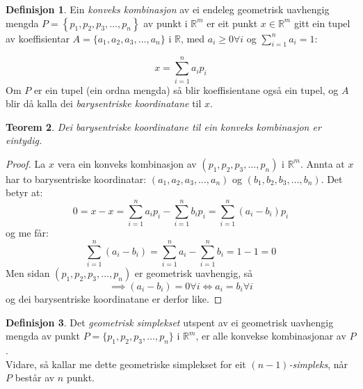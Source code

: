 \documentclass[a4paper, titlepage, 12pt, norsk]{article}
\theoremstyle{plain}
\newtheorem{theorem}{Teorem}[section]
\theoremstyle{definition}
\newtheorem{definition}[theorem]{Definisjon}
\newcommand{\Rb}{\mathbb{R}}
\newcommand{\set}[1]{ \left \{ #1 \right \} } %
\begin{document}
\begin{definition}
	Ein \emph{konveks kombinasjon} av ei endeleg geometrisk uavhengig mengda \( P = \set{p_1, p_2, p_3, \dots, p_n} \) av punkt i \( \Rb^m \) er eit punkt \( x\in\Rb^m \) gitt ein tupel av koeffisientar \( A=\{a_1, a_2, a_3, \dots, a_n\} \) i \( \Rb \), med \( a_i\geq0\forall i \) og \( \sum_{i=1}^n a_i = 1 : \)
	
	\begin{equation*}
		x=\sum_{i=1}^n a_ip_i
	\end{equation*}
	Om $P$ er ein tupel (ein ordna mengda) så blir koeffisientane også ein tupel, og $A$ blir då kalla dei \emph{barysentriske koordinatane} til $x$.
\end{definition}

\begin{theorem} \label{thm:unik-barysentrisk-koordinat}
	Dei barysentriske koordinatane til ein konveks kombinasjon er eintydig.
\end{theorem}

\begin{proof}
	La $x$ vera ein konveks kombinasjon av $(p_1, p_2, p_3, \dots, p_n)$ i $\Rb^m$. Annta at $x$ har to barysentriske koordinatar: $(a_1, a_2, a_3, \dots, a_n)$ og $(b_1, b_2, b_3, \dots, b_n)$. Det betyr at:
	\begin{equation*}
		0 = x - x = \sum_{i=1}^n a_ip_i - \sum_{i=1}^n b_ip_i=\sum_{i=1}^n (a_i-b_i)p_i
	\end{equation*}
	og me får:
	\begin{equation*}
		\sum_{i=1}^n(a_i-b_i)=\sum_{i=1}^na_i - \sum_{i=1}^nb_i = 1 - 1 = 0
	\end{equation*}
	Men sidan $(p_1, p_2, p_3, \dots, p_n)$ er geometrisk uavhengig, så 
	\begin{equation*}
		\implies (a_i-b_i)=0\forall i \Longleftrightarrow a_i = b_i \forall i
	\end{equation*}
	og dei barysentriske koordinatane er derfor like.
\end{proof}

\begin{definition}
	Det \emph{geometrisk simplekset} utspent av ei geometrisk uavhengig mengda av punkt $P=\{p_1, p_2, p_3, \dots, p_n\}$ i $\Rb^m$, er alle konvekse kombinasjonar av $P$.
	\\Vidare, så kallar me dette geometriske simplekset for eit \emph{$(n-1)$-simpleks}, når $P$ består av $n$ punkt.
\end{definition}
\end{document}

